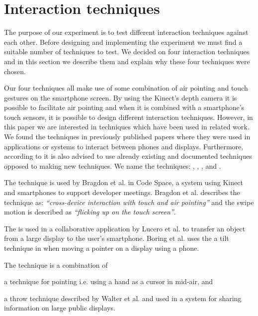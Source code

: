 \section{Interaction techniques}
The purpose of our experiment is to test different interaction techniques against each other.
Before designing and implementing the experiment we must find a suitable number of techniques to test. 
We decided on four interaction techniques and in this section we describe them and explain why these four techniques were chosen.

Our four techniques all make use of some combination of air pointing and touch gestures on the smartphone screen.
By using the Kinect's depth camera it is possible to facilitate air pointing and when it is combined with a smartphone's touch sensors, it is possible to design different interaction techniques.
However, in this paper we are interested in techniques which have been used in related work. 
We found the techniques in previously published papers where they were used in applications or systems to interact between phones and displays. 
Furthermore, according to  it is also advised to use already existing and documented techniques opposed to making new techniques. 
We name the techniques: \swipe, \tilt, \throw, and \pinch.

The \swipe technique is used by Bragdon et al. \cite{Bragdon:2011} in Code Space, a system using Kinect and smartphones to support developer meetings. 
Bragdon et al. describes the technique as: \emph{``cross-device interaction with touch and air pointing''} and the swipe motion is described as \emph{``flicking up on the touch screen''}. 

The \tilt is used in a collaborative application by Lucero et al. \cite{Lucero:2012} to transfer an object from a large display to the user's smartphone.
Boring et al. uses the a tilt technique in \cite{Boring:2009} when moving a pointer on a display using a phone.

The \throw technique is a combination of  
\begin{enumerate*}[label=\itshape\alph*\upshape)]
	\item{a technique for pointing \cite{Scheible:2008} i.e. using a hand as a cursor in mid-air, and}
	\item{a throw technique described by Walter et al. \cite{Walter:2014} and used in a system for sharing information on large public displays.}
\end{enumerate*}

